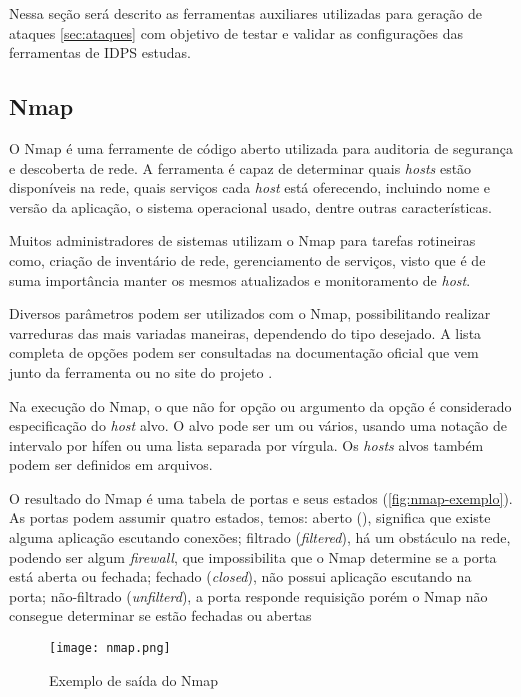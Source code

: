  Nessa seção será descrito as ferramentas auxiliares utilizadas para geração de ataques \autoref{sec:ataques} com objetivo de testar e validar as configurações das ferramentas de IDPS estudas. 

 \subsection{Nmap} \label{sec:nmap}

 O Nmap é uma ferramente de código aberto utilizada para auditoria de segurança e descoberta de rede. A ferramenta é capaz de determinar quais \textit{hosts} estão disponíveis na rede, quais serviços cada \textit{host} está oferecendo, incluindo nome e versão da aplicação, o sistema operacional usado, dentre outras características.  

 Muitos administradores de sistemas utilizam o Nmap para tarefas rotineiras como, criação de inventário de rede, gerenciamento de serviços, visto que é de suma importância manter os mesmos atualizados e monitoramento de \textit{host}.

 Diversos parâmetros podem ser utilizados com o Nmap, possibilitando realizar varreduras das mais variadas maneiras, dependendo do tipo desejado. A lista completa de opções podem ser consultadas na documentação oficial que vem junto da ferramenta ou no site do projeto \cite{nmap}. 

 Na execução do Nmap, o que não for opção ou argumento da opção é considerado especificação do \textit{host} alvo. O alvo pode ser um ou vários, usando uma notação de intervalo por hífen ou uma lista separada por vírgula. Os \textit{hosts} alvos também podem ser definidos em arquivos.

 O resultado do Nmap é uma tabela de portas e seus estados (\autoref{fig:nmap-exemplo}). As portas podem assumir quatro estados, temos: aberto (), significa que existe alguma aplicação escutando conexões; filtrado (\textit{filtered}), há um obstáculo na rede, podendo ser algum \textit{firewall}, que impossibilita que o Nmap determine se a porta está aberta ou fechada; fechado (\textit{closed}), não possui aplicação escutando na porta; não-filtrado (\textit{unfilterd}), a porta responde requisição porém o Nmap não consegue determinar se estão fechadas ou abertas \cite{nmap}

 \begin{figure}[htb]
  \centering
  \texttt{[image: nmap.png]}
  \caption{Exemplo de saída do Nmap}
  \label{fig:nmap-exemplo}
 \end{figure}

